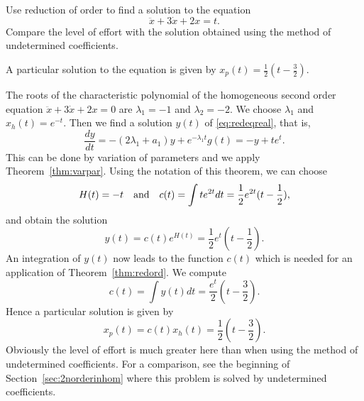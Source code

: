 \documentclass{ximera}
\begin{document}
\begin{exercise} \label{c14.3.3}
Use reduction of order to find a solution to the equation
\begin{equation}  \label{e:inhomex2}
\ddot{x} + 3\dot{x}+2x = t.
\end{equation}
Compare the level of effort with the solution obtained using the
method of undetermined coefficients.

\begin{solution}
\ans A particular solution to the equation is given by
$x_p(t) = \frac{1}{2}(t-\frac{3}{2})$.

\soln The roots of the characteristic polynomial of the homogeneous
second order equation $\ddot x + 3\dot x + 2x = 0$
are $\lambda_1 = -1 $ and $\lambda_2 = -2$.
We choose $\lambda_1$ and $x_h(t)=e^{-t}$.  Then we find a solution
$y(t)$ of \eqref{eq:redeqreal}, that is,
\[
\frac{dy}{dt} = -(2\lambda_1 +a_1) y + e^{-\lambda_1 t}g(t) =
-y + te^t.
\]
This can be done by variation of parameters and we apply
Theorem~\ref{thm:varpar}.  Using the notation of this theorem, we can
choose
\[
H(t) = -t \quad\mbox{and}\quad c(t) = \int t e^{2t} dt = \frac{1}{2}e^{2t}(t-\frac{1}{2}),
\]
and obtain the solution
\[
y(t) = c(t)e^{H(t)} = \frac{1}{2}e^{t}(t-\frac{1}{2}).
\]
An integration of $y(t)$ now leads to the function $c(t)$ which is needed
for an application of Theorem~\ref{thm:redord}.  We compute
\[
c(t) = \int y(t)dt = \frac{e^t}{2}(t-\frac{3}{2}).
\]
Hence a particular solution is given by
\[
x_p(t) = c(t) x_h(t) =  \frac{1}{2}(t-\frac{3}{2}).
\]
Obviously the level of effort is much greater here than when using the method
of undetermined coefficients.  For a comparison, see the
beginning of Section~\ref{sec:2norderinhom} where
this problem is solved by undetermined coefficients.


\end{solution}
\end{exercise}
\end{document}
